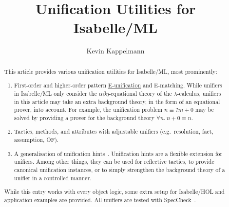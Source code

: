 \documentclass[11pt,a4paper]{article}
\begin{document}
\title{Unification Utilities for Isabelle/ML}
\author{Kevin Kappelmann}
\maketitle

\begin{abstract}
This article provides various unification utilities for Isabelle/ML, most prominently:
\begin{enumerate}
\item First-order and higher-order pattern
\href{https://en.wikipedia.org/wiki/Unification_(computer_science)#E-unification}{E-unification}
and E-matching.
While unifiers in Isabelle/ML only consider the $\alpha\beta\eta$-equational theory of the $\lambda$-calculus,
unifiers in this article
may take an extra background theory, in the form of an equational prover, into account.
For example, the unification problem $n \equiv {}?m + 0$
may be solved by providing a prover for the background theory $\forall n.\ n + 0 \equiv n$.
\item Tactics, methods, and attributes with adjustable unifiers (e.g.\ resolution, fact, assumption, OF).
\item A generalisation of unification hints~\cite{unif-hints}.
Unification hints are a flexible extension for unifiers.
Among other things, they can be used for reflective tactics,
to provide canonical unification instances,
or to simply strengthen the background theory of a unifier in a controlled manner.
\end{enumerate}
While this entry works with every object logic,
some extra setup for Isabelle/HOL and application examples are provided.
All unifiers are tested with SpecCheck~\cite{speccheck}.
\end{abstract}

\tableofcontents





\end{document}
